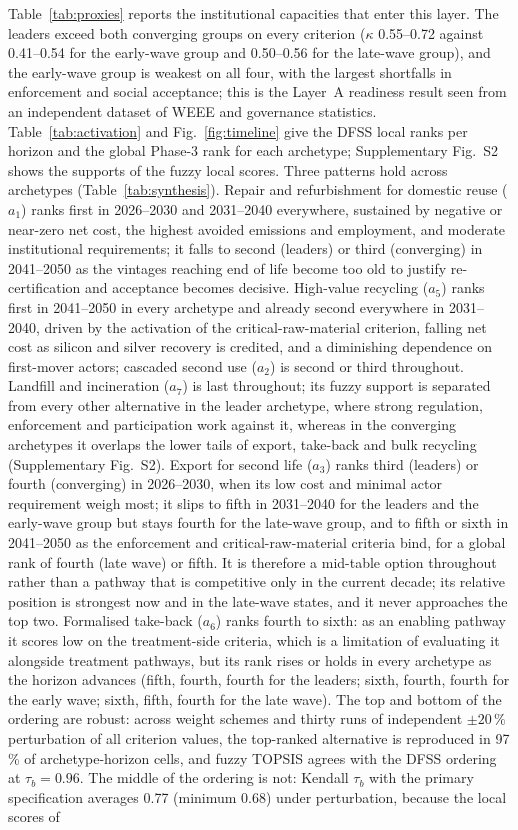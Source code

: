 \documentclass[a4paper,fleqn]{cas-sc}
\begin{document}
Table~\ref{tab:proxies} reports the institutional capacities that enter this layer. The leaders exceed both converging groups on every criterion ($\kappa$ 0.55--0.72 against 0.41--0.54 for the early-wave group and 0.50--0.56 for the late-wave group), and the early-wave group is weakest on all four, with the largest shortfalls in enforcement and social acceptance; this is the Layer~A readiness result seen from an independent dataset of WEEE and governance statistics. Table~\ref{tab:activation} and Fig.~\ref{fig:timeline} give the DFSS local ranks per horizon and the global Phase-3 rank for each archetype; Supplementary Fig.~S2 shows the supports of the fuzzy local scores. Three patterns hold across archetypes (Table~\ref{tab:synthesis}). Repair and refurbishment for domestic reuse ($a_1$) ranks first in 2026--2030 and 2031--2040 everywhere, sustained by negative or near-zero net cost, the highest avoided emissions and employment, and moderate institutional requirements; it falls to second (leaders) or third (converging) in 2041--2050 as the vintages reaching end of life become too old to justify re-certification and acceptance becomes decisive. High-value recycling ($a_5$) ranks first in 2041--2050 in every archetype and already second everywhere in 2031--2040, driven by the activation of the critical-raw-material criterion, falling net cost as silicon and silver recovery is credited, and a diminishing dependence on first-mover actors; cascaded second use ($a_2$) is second or third throughout. Landfill and incineration ($a_7$) is last throughout; its fuzzy support is separated from every other alternative in the leader archetype, where strong regulation, enforcement and participation work against it, whereas in the converging archetypes it overlaps the lower tails of export, take-back and bulk recycling (Supplementary Fig.~S2). Export for second life ($a_3$) ranks third (leaders) or fourth (converging) in 2026--2030, when its low cost and minimal actor requirement weigh most; it slips to fifth in 2031--2040 for the leaders and the early-wave group but stays fourth for the late-wave group, and to fifth or sixth in 2041--2050 as the enforcement and critical-raw-material criteria bind, for a global rank of fourth (late wave) or fifth. It is therefore a mid-table option throughout rather than a pathway that is competitive only in the current decade; its relative position is strongest now and in the late-wave states, and it never approaches the top two. Formalised take-back ($a_6$) ranks fourth to sixth: as an enabling pathway it scores low on the treatment-side criteria, which is a limitation of evaluating it alongside treatment pathways, but its rank rises or holds in every archetype as the horizon advances (fifth, fourth, fourth for the leaders; sixth, fourth, fourth for the early wave; sixth, fifth, fourth for the late wave). The top and bottom of the ordering are robust: across weight schemes and thirty runs of independent $\pm20\,\%$ perturbation of all criterion values, the top-ranked alternative is reproduced in 97\,\% of archetype-horizon cells, and fuzzy TOPSIS agrees with the DFSS ordering at $\tau_b=0.96$. The middle of the ordering is not: Kendall $\tau_b$ with the primary specification averages 0.77 (minimum 0.68) under perturbation, because the local scores of 
\end{document}
